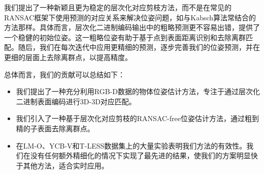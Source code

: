我们提出了一种新颖且更为稳定的层次化对应剪枝方法，而不是在常见的RANSAC框架下使用预测的对应关系来解决位姿问题，如与Kabsch算法\cite{umeyama1991least}常结合的方法那样。具体而言，层次化二进制编码输出中的粗略预测更不容易出错，提供了一个稳健的初始位姿。这一粗略位姿有助于基于点到表面距离识别和去除离群匹配。随后，我们在每次迭代中应用更精细的预测，逐步完善我们的位姿预测，并在更细的层面上去除离群点，以提高精度。

总体而言，我们的贡献可以总结如下：
\begin{itemize}
\item 我们提出了一种充分利用RGB-D数据的物体位姿估计方法，专注于通过层次化二进制表面编码进行3D-3D对应匹配。
\item 我们引入了一种基于层次化对应剪枝的RANSAC-free位姿估计方法，通过粗到精的子表面去除离群点。
\item 在LM-O、YCB-V和T-LESS数据集上的大量实验表明我们方法的有效性。我们在没有任何额外精细化的情况下实现了最先进的结果，使我们的方案明显快于其他方法，适合实时应用。
\end{itemize}

